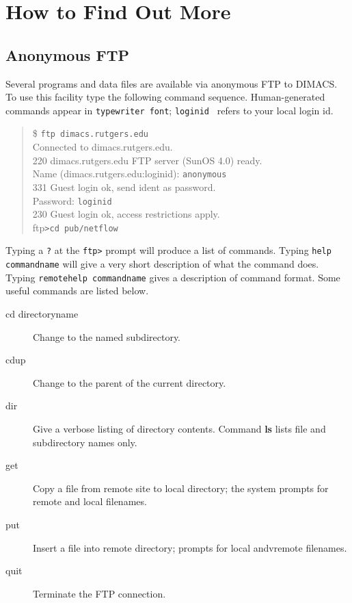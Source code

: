\section{How to Find Out More}

\subsection{Anonymous FTP}
Several programs and data files are available via anonymous FTP to 
DIMACS.   To use this facility type the following command sequence. 
Human-generated commands appear in {\tt typewriter
font}; {\tt loginid } refers to your local login id. 
\begin{verse}
\$ {\tt ftp dimacs.rutgers.edu}  \\
Connected to dimacs.rutgers.edu. \\
220 dimacs.rutgers.edu FTP server (SunOS 4.0) ready. \\
Name (dimacs.rutgers.edu:loginid): {\tt anonymous}\\
331 Guest login ok, send ident as password. \\
Password: {\tt loginid} \\
230 Guest login ok, access restrictions apply. \\
ftp{\tt >cd pub/netflow}
\end{verse} 
Typing a {\tt ?} at the {\tt ftp>} prompt will produce a list of 
commands. Typing {\tt help commandname} will give a very short description 
of what the command does.  Typing {\tt remotehelp commandname} gives
a description of command format.  Some useful commands are listed below. 
\begin{description}

\item[cd directoryname]  Change to the named subdirectory. 

\item[cdup] Change to the parent of the current directory. 

\item[dir] Give a verbose listing of directory contents. Command {\bf ls}
lists file and subdirectory names only.  

\item[get] Copy a file from remote site to local directory; the system 
prompts for remote and local filenames.  

\item[put] Insert a file into remote directory; prompts for local andvremote filenames.  

\item[quit] Terminate the FTP connection. 
\end{description}

